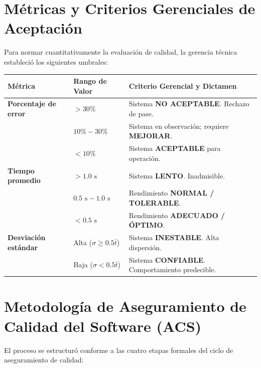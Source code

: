 \documentclass{article}
\begin{document}
\section{Métricas y Criterios Gerenciales de Aceptación}
Para normar cuantitativamente la evaluación de calidad, la gerencia técnica estableció los siguientes umbrales:

\begin{center}
\begin{tabularx}{\textwidth}{|l|l|X|}
\hline
\textbf{Métrica} & \textbf{Rango de Valor} & \textbf{Criterio Gerencial y Dictamen}\\ \hline
\textbf{Porcentaje de error} & $> 30\%$ & Sistema \textbf{NO ACEPTABLE}. Rechazo de pase.\\
& $10\% - 30\%$ & Sistema en observación; requiere \textbf{MEJORAR}.\\
& $< 10\%$ & Sistema \textbf{ACEPTABLE} para operación.\\ \hline
\textbf{Tiempo promedio} & $> 1.0\text{ s}$ & Sistema \textbf{LENTO}. Inadmisible.\\
& $0.5\text{ s} - 1.0\text{ s}$ & Rendimiento \textbf{NORMAL / TOLERABLE}.\\
& $< 0.5\text{ s}$ & Rendimiento \textbf{ADECUADO / ÓPTIMO}.\\ \hline
\textbf{Desviación estándar} & Alta ($\sigma \ge 0.5\bar{t}$) & Sistema \textbf{INESTABLE}. Alta dispersión.\\
& Baja ($\sigma < 0.5\bar{t}$) & Sistema \textbf{CONFIABLE}. Comportamiento predecible.\\
\hline
\end{tabularx}
\end{center}

\section{Metodología de Aseguramiento de Calidad del Software (ACS)}
El proceso se estructuró conforme a las cuatro etapas formales del ciclo de aseguramiento de calidad:
\end{document}
